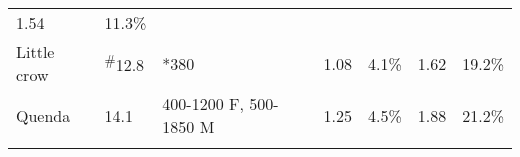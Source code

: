\documentclass[version=last,
    paper=a4,                               %
    10pt,                                   %
    dvipsnames,
    oneside,                              %
    headings=openany,                       %
    open=any,
    BCOR=7mm,                               %
    DIV=15,     %
]{scrbook}
\begin{document}
\begin{longtable}[c]{@{}lllllll@{}}
\begin{minipage}[t]{0.12\columnwidth}
1.54
\end{minipage} & \begin{minipage}[t]{0.12\columnwidth}\raggedright
11.3\%
\end{minipage}
\\\addlinespace
\begin{minipage}[t]{0.12\columnwidth}\raggedright
Little crow
\end{minipage} & \begin{minipage}[t]{0.12\columnwidth}\raggedright
\textsuperscript{\#}12.8
\end{minipage} & \begin{minipage}[t]{0.12\columnwidth}\raggedright
*380
\end{minipage} & \begin{minipage}[t]{0.12\columnwidth}\raggedright
1.08
\end{minipage} & \begin{minipage}[t]{0.12\columnwidth}\raggedright
4.1\%
\end{minipage} & \begin{minipage}[t]{0.12\columnwidth}\raggedright
1.62
\end{minipage} & \begin{minipage}[t]{0.12\columnwidth}\raggedright
19.2\%
\end{minipage}
\\\addlinespace
\begin{minipage}[t]{0.12\columnwidth}\raggedright
Quenda
\end{minipage} & \begin{minipage}[t]{0.12\columnwidth}\raggedright
14.1
\end{minipage} & \begin{minipage}[t]{0.12\columnwidth}\raggedright
400-1200 F, 500-1850 M
\end{minipage} & \begin{minipage}[t]{0.12\columnwidth}\raggedright
1.25
\end{minipage} & \begin{minipage}[t]{0.12\columnwidth}\raggedright
4.5\%
\end{minipage} & \begin{minipage}[t]{0.12\columnwidth}\raggedright
1.88
\end{minipage} & \begin{minipage}[t]{0.12\columnwidth}\raggedright
21.2\%
\end{minipage}
\\\addlinespace
\begin{minipage}[t]{0.12\columnwidth}\raggedright

\end{minipage}
\end{longtable}
\end{document}
